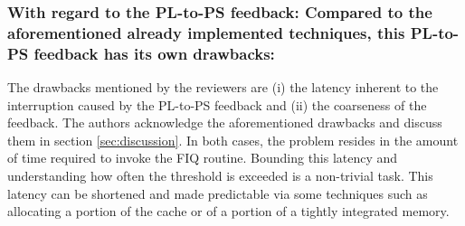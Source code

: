         \subsubsection{With regard to the PL-to-PS feedback: Compared to the aforementioned already implemented techniques, this PL-to-PS feedback has its own drawbacks:}
            The drawbacks mentioned by the reviewers are (i) the latency inherent to the interruption caused by the PL-to-PS feedback and (ii) the coarseness of the feedback.
            The authors acknowledge the aforementioned drawbacks and discuss them in section \ref{sec:discussion}.
            In both cases, the problem resides in the amount of time required to invoke the FIQ routine. Bounding this latency and understanding how often the threshold is exceeded is a non-trivial task. This latency can be shortened and made predictable via some techniques such as allocating a portion of the cache or of a portion of a tightly integrated memory.
